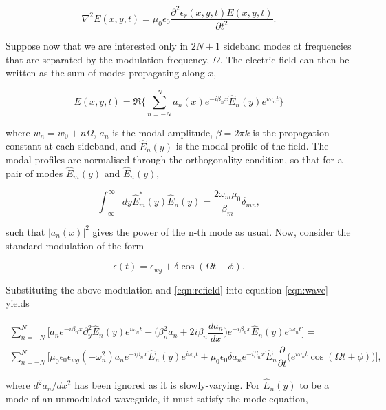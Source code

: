 \begin{equation}
\nabla^2 E(x,y,t) = \mu_0 \epsilon_0 \dfrac{\partial^2 \epsilon_r(x,y,t) E(x,y,t)}{\partial t^2}.
\label{eqn:wave}
\end{equation}

Suppose now that we are interested only in $2N+1$ sideband modes at frequencies that are separated by the modulation frequency, $\Omega$. The electric field can then be written as the sum of modes propagating along $x$,

\begin{equation}
E(x,y,t) = \Re \{\sum_{n=-N}^{N} a_n(x) e^{-i \beta_n x}\hat{E}_n(y)e^{i \omega_n t} \}
\label{eqn:refield}
\end{equation}

where $w_n=w_0+n \Omega$, $a_n$ is the modal amplitude, $\beta = 2 \pi  k$ is the propagation constant at each sideband, and $\hat{E}_n(y)$ is the modal profile of the field. The modal profiles are normalised through the orthogonality condition, so that for a pair of modes $\hat{E}_m(y)$ and $\hat{E}_n(y)$,

\begin{equation}
\int_{-\infty}^{\infty} dy \hat{E}^*_m(y) \hat{E}_n(y) = \dfrac{2 \omega_m \mu_0}{\beta_m} \delta_{mn},
\end{equation}

such that $|a_n(x)|^2$ gives the power of the n-th mode as usual. Now, consider the standard modulation of the form

\begin{equation}
\epsilon(t) = \epsilon_{wg}+ \delta \cos (\Omega t + \phi).
\end{equation}

Substituting the above modulation and \ref{eqn:refield} into equation \ref{eqn:wave} yields

\begin{multline}
\sum_{n=-N}^{N} \Big[ a_n e^{-i \beta_n x} \partial^2_y \hat{E}_n(y) e^{i \omega_n t} - \big( \beta^2_n a_n + 2 i \beta_n \dfrac{d a_n}{dx}\big) e^{-i \beta_n x} \hat{E}_n(y) e^{i \omega_n t} \Big] =\\ \sum_{n=-N}^{N} \Big[\mu_0 \epsilon_0 \epsilon_{wg} (-\omega^2_n) a_n e^{-i \beta_n x} \hat{E}_n(y) e^{i \omega_n t} + \mu_0 \epsilon_0 \delta a_n e^{-i \beta_n x} \hat{E}_n \dfrac{\partial}{\partial t} \big( e^{i \omega_n t} \cos (\Omega t + \phi) \big) \Big],
\label{eqn:longequationlol}
\end{multline}

where $d^2 a_n/dx^2$ has been ignored as it is slowly-varying. For $\hat{E}_n (y)$ to be a mode of an unmodulated waveguide, it must satisfy the mode equation,

